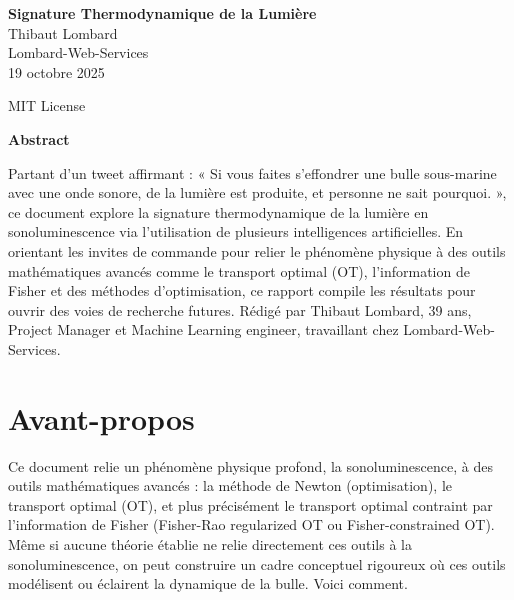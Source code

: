 \documentclass[a4paper,12pt]{article}
\begin{document}
\thispagestyle{empty}

\begin{center}
\vspace*{\fill} %

\textbf{\LARGE Signature Thermodynamique de la Lumière} \\[10pt]
\small Thibaut Lombard \\[5pt]
\small Lombard-Web-Services \\[30pt]

{\large 19 octobre 2025}

\vspace*{\fill} %
\end{center}

\begin{center}
\footnotesize MIT License
\end{center}

\newpage
\newpage
\tableofcontents
\newpage
\thispagestyle{empty} %
\begin{center}
\vspace*{\fill}
\textbf{\Large Abstract}
\vspace{1em}

\begin{minipage}{0.85\textwidth}
\small
Partant d'un tweet affirmant : « Si vous faites s'effondrer une bulle sous-marine avec une onde sonore, de la lumière est produite, et personne ne sait pourquoi. », ce document explore la signature thermodynamique de la lumière en sonoluminescence via l'utilisation de plusieurs intelligences artificielles. En orientant les invites de commande pour relier le phénomène physique à des outils mathématiques avancés comme le transport optimal (OT), l'information de Fisher et des méthodes d'optimisation, ce rapport compile les résultats pour ouvrir des voies de recherche futures. Rédigé par Thibaut Lombard, 39 ans, Project Manager et Machine Learning engineer, travaillant chez Lombard-Web-Services.
\end{minipage}

\vspace*{\fill}
\end{center}
\newpage
\section{Avant-propos}
Ce document relie un phénomène physique profond, la sonoluminescence, à des outils mathématiques avancés : la méthode de Newton (optimisation), le transport optimal (OT), et plus précisément le transport optimal contraint par l'information de Fisher (Fisher-Rao regularized OT ou Fisher-constrained OT). Même si aucune théorie établie ne relie directement ces outils à la sonoluminescence, on peut construire un cadre conceptuel rigoureux où ces outils modélisent ou éclairent la dynamique de la bulle. Voici comment.
\end{document}
